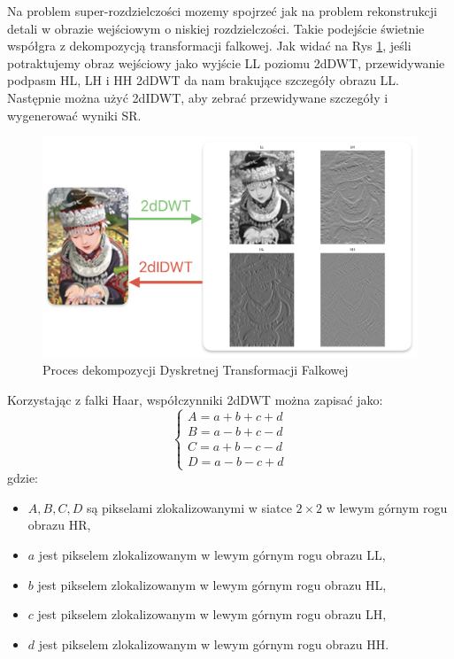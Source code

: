 Na problem super-rozdzielczości mozemy spojrzeć jak na problem rekonstrukcji detali w obrazie wejściowym o niskiej rozdzielczości. Takie podejście świetnie współgra z dekompozycją transformacji falkowej. Jak widać na Rys \ref{fig:image48}, jeśli potraktujemy obraz wejściowy jako wyjście LL poziomu 2dDWT, przewidywanie podpasm HL, LH i HH 2dDWT da nam brakujące szczegóły obrazu LL. Następnie można użyć 2dIDWT, aby zebrać przewidywane szczegóły i wygenerować wyniki SR.


\begin{figure}[ht]
    \centering
    \begin{minipage}[t]{0.7\linewidth}
        \includegraphics[width=\linewidth]{Rozdziały/03.DWSR/Obrazy/konstrukcja_2dDWT.png}  
        \caption{Proces dekompozycji Dyskretnej Transformacji Falkowej}
        \label{fig:image48}
    \end{minipage}
\end{figure}


Korzystając z falki Haar, współczynniki 2dDWT można zapisać jako:
\begin{equation*}
    \left\{\begin{array}{l}
    A=a+b+c+d \\
    B=a-b+c-d \\
    C=a+b-c-d \\
    D=a-b-c+d
    \end{array}\right.
\end{equation*}
gdzie: 
\begin{itemize}
    \item $A, B, C, D$ są pikselami zlokalizowanymi w siatce $2 \times  2$ w lewym górnym rogu obrazu HR,
    \item $a$ jest pikselem zlokalizowanym w lewym górnym rogu obrazu LL,
    \item $b$ jest pikselem zlokalizowanym w lewym górnym rogu obrazu HL,
    \item $c$ jest pikselem zlokalizowanym w lewym górnym rogu obrazu LH,
    \item $d$ jest pikselem zlokalizowanym w lewym górnym rogu obrazu HH.
\end{itemize}

